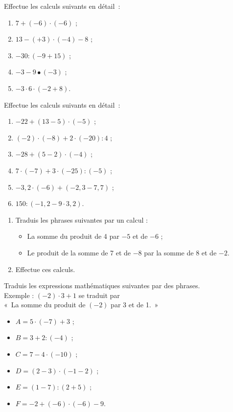 \begin{exercice}
Effectue les calculs suivants en détail :
\begin{enumerate}
 \item $7 + (- 6) \cdot (- 6)$ ;
 \item $13 - (+ 3) \cdot (- 4) - 8$ ;
 \item $- 30 : (- 9 + 15)$ ;
 \item $- 3 - 9 • (- 3)$ ;
 \item $- 3 \cdot 6 \cdot (- 2 + 8)$.
 \end{enumerate}
\end{exercice}


\begin{exercice}
Effectue les calculs suivants en détail :
\begin{enumerate}
 \item $- 22 + (13 - 5) \cdot (- 5)$ ;
 \item $(- 2) \cdot (- 8) + 2 \cdot (- 20) : 4$ ;
 \item $- 28 + (5 - 2) \cdot (- 4)$ ;
 \item $7 \cdot (- 7) + 3 \cdot (- 25) : (- 5)$ ;
 \item $- 3,2 \cdot (- 6) + (- 2,3 - 7,7)$ ;
 \item $150 : (- 1,2 - 9 \cdot 3,2)$.
 \end{enumerate}
\end{exercice}


\begin{exercice}[Vocabulaire]
\begin{enumerate}
 \item Traduis les phrases suivantes par un calcul :
 \begin{itemize}
  \item \textcolor{A1}{La somme du produit de 4 par $- 5$ et de $- 6$ ;}
  \item \textcolor{H1}{Le produit de la somme de 7 et de $- 8$ par la somme de 8 et de $- 2$.}
  \end{itemize}  
 \item Effectue ces calculs.
 \end{enumerate}
\end{exercice}


\begin{exercice}
Traduis les expressions mathématiques suivantes par des phrases. \\[0.5em]
Exemple : $(- 2) \cdot 3 + 1$ se traduit par \\[0.5em]
« \textcolor{A1}{La somme du produit de $(- 2)$ par 3 et de 1.} »\\[0.5em]
\begin{itemize}
 \item $A = 5 \cdot (- 7) + 3$ ;
 \item $B = 3 + 2 : (- 4)$ ;
 \item $C = 7 - 4 \cdot (- 10)$ ;
 \item $D = (2 - 3) \cdot (- 1 - 2)$ ;
 \item $E = (1 - 7) : (2 + 5)$ ;
 \item $F = - 2 +(- 6) \cdot (- 6) - 9$.
 \end{itemize}
\end{exercice}


